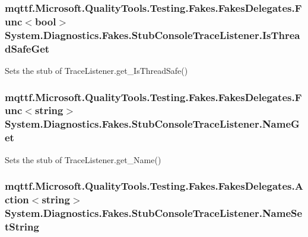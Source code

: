 \hypertarget{class_system_1_1_diagnostics_1_1_fakes_1_1_stub_console_trace_listener_a21ba4bb53a9db25517d42ddc7dcceaf3}{
\subsubsection[{Is\-Thread\-Safe\-Get}]{\setlength{\rightskip}{0pt plus 5cm}mqttf.\-Microsoft.\-Quality\-Tools.\-Testing.\-Fakes.\-Fakes\-Delegates.\-Func$<$bool$>$ System.\-Diagnostics.\-Fakes.\-Stub\-Console\-Trace\-Listener.\-Is\-Thread\-Safe\-Get}}\label{class_system_1_1_diagnostics_1_1_fakes_1_1_stub_console_trace_listener_a21ba4bb53a9db25517d42ddc7dcceaf3}


Sets the stub of Trace\-Listener.\-get\-\_\-\-Is\-Thread\-Safe()

\hypertarget{class_system_1_1_diagnostics_1_1_fakes_1_1_stub_console_trace_listener_ac01b64cbc687f9514fe9d82c1c0fe08b}{
\subsubsection[{Name\-Get}]{\setlength{\rightskip}{0pt plus 5cm}mqttf.\-Microsoft.\-Quality\-Tools.\-Testing.\-Fakes.\-Fakes\-Delegates.\-Func$<$string$>$ System.\-Diagnostics.\-Fakes.\-Stub\-Console\-Trace\-Listener.\-Name\-Get}}\label{class_system_1_1_diagnostics_1_1_fakes_1_1_stub_console_trace_listener_ac01b64cbc687f9514fe9d82c1c0fe08b}


Sets the stub of Trace\-Listener.\-get\-\_\-\-Name()

\hypertarget{class_system_1_1_diagnostics_1_1_fakes_1_1_stub_console_trace_listener_a62bf6ae5352643769b8de6afd77f0f4d}{
\subsubsection[{Name\-Set\-String}]{\setlength{\rightskip}{0pt plus 5cm}mqttf.\-Microsoft.\-Quality\-Tools.\-Testing.\-Fakes.\-Fakes\-Delegates.\-Action$<$string$>$ System.\-Diagnostics.\-Fakes.\-Stub\-Console\-Trace\-Listener.\-Name\-Set\-String}}\label{class_system_1_1_diagnostics_1_1_fakes_1_1_stub_console_trace_listener_a62bf6ae5352643769b8de6afd77f0f4d}


